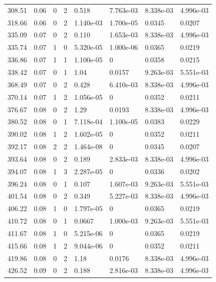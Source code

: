 \documentclass[preview]{standalone}
\begin{document}
{{{\begin{tabular}{L{1.2cm}C{1.2cm} C{0.3cm}C{0.5cm} C{1.4cm}C{1.4cm} C{1.4cm}C{1.4cm}}
  308.51  &  0.06  & 0     &  2 &  0.518  & 7.763e-03  & 8.338e-03 &  4.996e-03   \\ 
  318.66  &  0.06  & 0     &  2 &  1.140e-03  & 1.700e-05  & 0.0345 &  0.0207   \\ 
  335.09  &  0.07  & 0     &  2 &  0.110  & 1.653e-03  & 8.338e-03 &  4.996e-03   \\ 
  335.74  &  0.07  & 1     &  0 &  5.320e-05  & 1.000e-06  & 0.0365 &  0.0219   \\ 
  336.86  &  0.07  & 1     &  1 &  1.100e-05  & 0  & 0.0358 &  0.0215   \\ 
  338.42  &  0.07  & 0     &  1 &  1.04  & 0.0157  & 9.263e-03 &  5.551e-03   \\ 
  368.49  &  0.07  & 0     &  2 &  0.428  & 6.410e-03  & 8.338e-03 &  4.996e-03   \\ 
  370.14  &  0.07  & 1     &  2 &  1.056e-05  & 0  & 0.0352 &  0.0211   \\ 
  376.67  &  0.08  & 0     &  2 &  1.29  & 0.0193  & 8.338e-03 &  4.996e-03   \\ 
  380.52  &  0.08  & 0     &  1 &  7.118e-04  & 1.100e-05  & 0.0383 &  0.0229   \\ 
  390.02  &  0.08  & 1     &  2 &  1.602e-05  & 0  & 0.0352 &  0.0211   \\ 
  392.17  &  0.08  & 2     &  2 &  1.464e-08  & 0  & 0.0345 &  0.0207   \\ 
  393.64  &  0.08  & 0     &  2 &  0.189  & 2.833e-03  & 8.338e-03 &  4.996e-03   \\ 
  394.07  &  0.08  & 1     &  3 &  2.287e-05  & 0  & 0.0336 &  0.0202   \\ 
  396.24  &  0.08  & 0     &  1 &  0.107  & 1.607e-03  & 9.263e-03 &  5.551e-03   \\ 
  401.54  &  0.08  & 0     &  2 &  0.349  & 5.227e-03  & 8.338e-03 &  4.996e-03   \\ 
  406.22  &  0.08  & 1     &  0 &  1.797e-05  & 0  & 0.0365 &  0.0219   \\ 
  410.72  &  0.08  & 0     &  1 &  0.0667  & 1.000e-03  & 9.263e-03 &  5.551e-03   \\ 
  411.67  &  0.08  & 1     &  0 &  5.215e-06  & 0  & 0.0365 &  0.0219   \\ 
  415.66  &  0.08  & 1     &  2 &  9.044e-06  & 0  & 0.0352 &  0.0211   \\ 
  419.86  &  0.08  & 0     &  2 &  1.18  & 0.0176  & 8.338e-03 &  4.996e-03   \\ 
  426.52  &  0.09  & 0     &  2 &  0.188  & 2.816e-03  & 8.338e-03 &  4.996e-03   \\ 

\end{tabular}}}}
\end{document}

